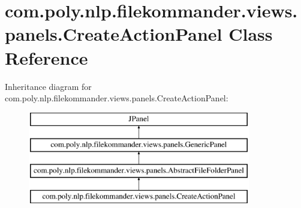 \hypertarget{classcom_1_1poly_1_1nlp_1_1filekommander_1_1views_1_1panels_1_1_create_action_panel}{\section{com.\-poly.\-nlp.\-filekommander.\-views.\-panels.\-Create\-Action\-Panel Class Reference}
\label{classcom_1_1poly_1_1nlp_1_1filekommander_1_1views_1_1panels_1_1_create_action_panel}
}
Inheritance diagram for com.\-poly.\-nlp.\-filekommander.\-views.\-panels.\-Create\-Action\-Panel\-:\begin{figure}[H]
\begin{center}
\leavevmode
\includegraphics[height=4.000000cm]{classcom_1_1poly_1_1nlp_1_1filekommander_1_1views_1_1panels_1_1_create_action_panel}
\end{center}
\end{figure}
